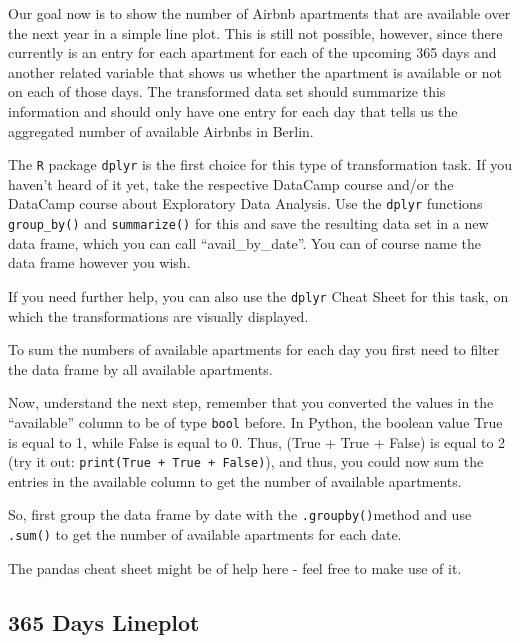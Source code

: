 \documentclass[
  11pt,
]{book}
\newenvironment{tips}[1]
  {
  \begin{itemize}
  \footnotesize
  \renewcommand{\labelitemi}{
    \raisebox{-.7\height}[0pt][0pt]{
      {\setkeys{Gin}{width=3em,keepaspectratio}
        \texttt{[image: images/\#1.png]}}
    }
  }
  \setlength{\fboxsep}{1em}
  \begin{rbox}
  \item
  }
  {
  \end{rbox}
  \end{itemize}
  }
\newenvironment{tipsp}[1]
  {
  \begin{itemize}
  \footnotesize
  \renewcommand{\labelitemi}{
    \raisebox{-.7\height}[0pt][0pt]{
      {\setkeys{Gin}{width=3em,keepaspectratio}
        \texttt{[image: images/\#1.png]}}
    }
  }
  \setlength{\fboxsep}{1em}
  \begin{pbox}
  \item
  }
  {
  \end{pbox}
  \end{itemize}
  }
\begin{document}
Our goal now is to show the number of Airbnb apartments that are available over the next year in a simple line plot. This is still not possible, however, since there currently is an entry for each apartment for each of the upcoming 365 days and another related variable that shows us whether the apartment is available or not on each of those days. The transformed data set should summarize this information and should only have one entry for each day that tells us the aggregated number of available Airbnbs in Berlin.

\begin{tips}r

The \texttt{R} package \texttt{dplyr} is the first choice for this type of transformation task. If you haven't heard of it yet, take the respective DataCamp course and/or the DataCamp course about Exploratory Data Analysis. Use the \texttt{dplyr} functions \texttt{group\_by()} and \texttt{summarize()} for this and save the resulting data set in a new data frame, which you can call ``avail\_by\_date''. You can of course name the data frame however you wish.

If you need further help, you can also use the \texttt{dplyr} Cheat Sheet for this task, on which the transformations are visually displayed.

\end{tips}

\begin{tipsp}p

To sum the numbers of available apartments for each day you first need to filter the data frame by all available apartments.

Now, understand the next step, remember that you converted the values in the ``available'' column to be of type \texttt{bool} before. In Python, the boolean value True is equal to 1, while False is equal to 0. Thus, (True + True + False) is equal to 2 (try it out: \texttt{print(True\ +\ True\ +\ False)}), and thus, you could now sum the entries in the available column to get the number of available apartments.

So, first group the data frame by date with the \texttt{.groupby()}method and use \texttt{.sum()} to get the number of available apartments for each date.

The pandas cheat sheet might be of help here - feel free to make use of it.

\end{tipsp}

\hypertarget{days-lineplot}{%
\subsection{365 Days Lineplot}\label{days-lineplot}}
\end{document}
